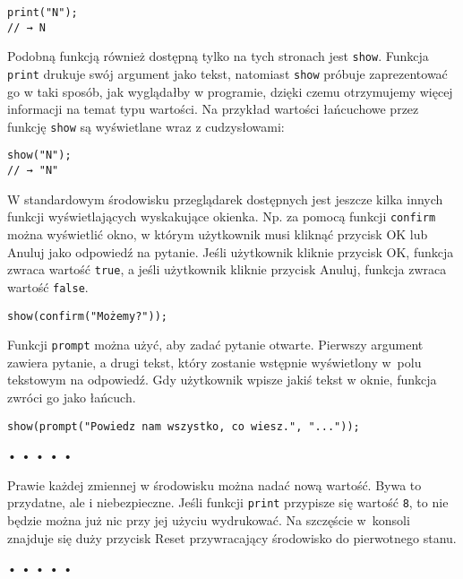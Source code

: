 \begin{verbatim} 
print("N");
// → N
\end{verbatim}
    
Podobną funkcją również dostępną tylko na tych stronach jest \texttt{show}. Funkcja \texttt{print} drukuje swój argument jako tekst, natomiast \texttt{show} próbuje zaprezentować go w taki sposób, jak wyglądałby w programie, dzięki czemu otrzymujemy więcej informacji na temat typu wartości. Na przykład wartości łańcuchowe przez funkcję \texttt{show} są wyświetlane wraz z cudzysłowami:

\begin{verbatim} 
show("N");
// → "N"
\end{verbatim}
    
W standardowym środowisku przeglądarek dostępnych jest jeszcze kilka innych funkcji wyświetlających wyskakujące okienka. Np. za pomocą funkcji \texttt{confirm} można wyświetlić okno, w którym użytkownik musi kliknąć przycisk OK lub Anuluj jako odpowiedź na pytanie. Jeśli użytkownik kliknie przycisk OK, funkcja zwraca wartość \texttt{true}, a jeśli użytkownik kliknie przycisk Anuluj, funkcja zwraca wartość \texttt{false}.

\begin{verbatim} 
show(confirm("Możemy?"));
\end{verbatim}
    
Funkcji \texttt{prompt} można użyć, aby zadać pytanie otwarte. Pierwszy argument zawiera pytanie, a drugi tekst, który zostanie wstępnie wyświetlony w~polu tekstowym na odpowiedź. Gdy użytkownik wpisze jakiś tekst w oknie, funkcja zwróci go jako łańcuch.

\begin{verbatim} 
show(prompt("Powiedz nam wszystko, co wiesz.", "..."));
\end{verbatim}
  
\begin{center}
• • • • •
\end{center}
  
    
Prawie każdej zmiennej w środowisku można nadać nową wartość. Bywa to przydatne, ale i niebezpieczne. Jeśli funkcji \texttt{print} przypisze się wartość \texttt{8}, to nie będzie można już nic przy jej użyciu wydrukować. Na szczęście w~konsoli znajduje się duży przycisk Reset przywracający środowisko do pierwotnego stanu.

  
\begin{center}
• • • • •
\end{center}
  
